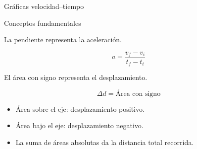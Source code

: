 \documentclass[aspectratio=169,10pt]{beamer}
\begin{document}
\begin{frame}{Gráficas velocidad--tiempo}

\begin{block}{Conceptos fundamentales}

La pendiente representa la aceleración.

\[
\boxed{
a=\frac{v_f-v_i}{t_f-t_i}
}
\]

El área con signo representa
el desplazamiento.

\[
\boxed{
\Delta d=\text{Área con signo}
}
\]

\end{block}

\begin{itemize}
\item Área sobre el eje: desplazamiento positivo.
\item Área bajo el eje: desplazamiento negativo.
\item La suma de áreas absolutas da
la distancia total recorrida.
\end{itemize}

\end{frame}
\end{document}
